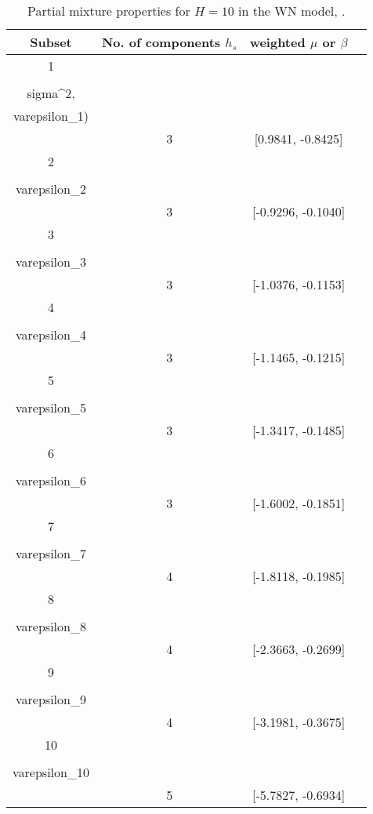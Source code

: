 \begin{table}[h] 
\centering 
\caption{Partial mixture properties for $H=10$ in the WN model, .} 
\label{tab:pmits_WN} 
\begin{tabular}{cccc}  
 Subset & No. of components $h_{s}$ & weighted $\mu$ or $\beta$  \\ \hline 
1 & \\{(\\sigma^{2},\\varepsilon_{1})\\} & 3 & [0.9841, -0.8425]   \\ [1ex] 
2 & \\{\\varepsilon_{2}\\} & 3 & [-0.9296, -0.1040]   \\ [1ex] 
3 & \\{\\varepsilon_{3}\\} & 3 & [-1.0376, -0.1153]   \\ [1ex] 
4 & \\{\\varepsilon_{4}\\} & 3 & [-1.1465, -0.1215]   \\ [1ex] 
5 & \\{\\varepsilon_{5}\\} & 3 & [-1.3417, -0.1485]   \\ [1ex] 
6 & \\{\\varepsilon_{6}\\} & 3 & [-1.6002, -0.1851]   \\ [1ex] 
7 & \\{\\varepsilon_{7}\\} & 4 & [-1.8118, -0.1985]   \\ [1ex] 
8 & \\{\\varepsilon_{8}\\} & 4 & [-2.3663, -0.2699]   \\ [1ex] 
9 & \\{\\varepsilon_{9}\\} & 4 & [-3.1981, -0.3675]   \\ [1ex] 
10 & \\{\\varepsilon_{10}\\} & 5 & [-5.7827, -0.6934]   \\ [1ex] 
\hline 
\end{tabular} 
\end{table} 
